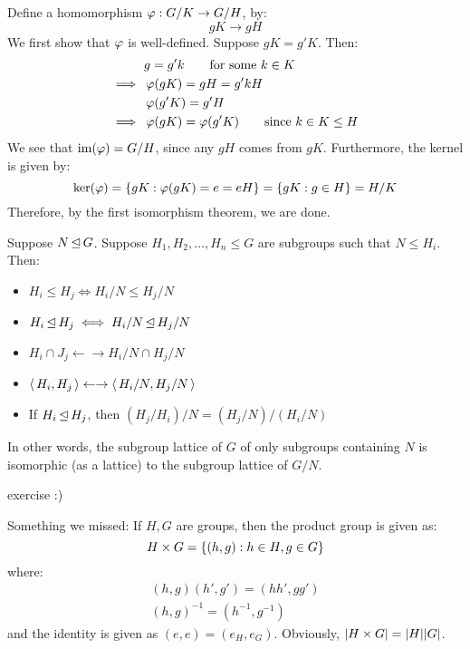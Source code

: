 \begin{pf}[source=Primary Source Material]
    Define a homomorphism $ \operatorname{\varphi}: G/K \rightarrow G/H $, by:
    \begin{equation*}
        gK \rightarrow gH
    \end{equation*}
    We first show that $ \operatorname{\varphi} $ is well-defined. Suppose $ gK = g'K $. Then:
    \begin{align*}
        & g = g'k \tag*{for some $ k \in K $} \\
        \implies \ & \operatorname{\varphi}(gK) = gH = g'kH \\
                   & \operatorname{\varphi}(g'K) = g'H \\
        \implies \ & \operatorname{\varphi}(gK) = \operatorname{\varphi}(g'K) \tag*{since $ k \in K \leq H $}
    \end{align*}
    We see that $ \operatorname{im}(\operatorname{\varphi}) = G/H $, since any $ gH $ comes from $ gK $.
    Furthermore, the kernel is given by:
    \begin{equation*}
        \ker(\operatorname{\varphi}) = \left\{{gK : \operatorname{\varphi}(gK) = e = eH}\right\} = \left\{{gK : g \in H}\right\} = H/K
    \end{equation*}
    Therefore, by the first isomorphism theorem, we are done.
\end{pf}

\begin{thm}[title=Fourth Isomorphism Theorem]
    Suppose $ N \operatorname{\trianglelefteq} G $. Suppose $ H_{1}, H_{2}, \dots, H_{n} \leq G $ are subgroups such that
    $ N \leq H_{i} $. Then:
    \begin{itemize}
        \item $ H_{i} \leq H_{j} \iff H_{i}/N \leq H_{j}/N $
        \item $ H_{i} \operatorname{\trianglelefteq} H_{j} \iff H_{i}/N \operatorname{\trianglelefteq} H_{j}/N $
        \item $ H_{i} \cap J_{j} \leftarrow\rightarrow H_{i}/N \cap H_{j}/N $
        \item $ \operatorname{\langle} H_{i}, H_{j} \operatorname{\rangle} \leftarrow\rightarrow \operatorname{\langle} H_{i}/N, H_{j}/N \operatorname{\rangle} $
        \item If $ H_{i} \operatorname{\trianglelefteq} H_{j} $, then $ (H_{j}/H_{i})/N = (H_{j}/N)/(H_{i}/N) $
    \end{itemize}
    In other words, the subgroup lattice of $ G $ of only subgroups containing $ N $ is
    isomorphic (as a lattice) to the subgroup lattice of $ G/N $.
\end{thm}

\begin{pf}
    exercise :)
\end{pf}

Something we missed: If $ H, G $ are groups, then the product group is given as:
\begin{equation*}
    H \times G = \left\{{(h, g) : h \in H, g \in G}\right\}
\end{equation*}
where:
\begin{gather*}
    (h, g)(h', g') = (hh', gg') \\
    (h, g)^{-1} = (h^{-1}, g^{-1})
\end{gather*}
and the identity is given as $ (e, e) = (e_{H}, e_{G}) $.
Obviously, $ \abs{H \times G} = \abs{H} \abs{G} $.

